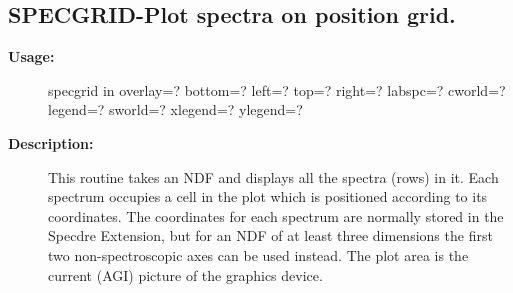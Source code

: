 \subsection{SPECGRID-\label{SPECGRID}Plot spectra on position grid.}
\begin{description}

\item [\textbf{Usage:}]

   specgrid in overlay=? bottom=? left=? top=? right=?
      labspc=? cworld=? legend=? sworld=? xlegend=? ylegend=?


\item [\textbf{Description:}]
   This routine takes an NDF and displays all the spectra (rows) in
   it. Each spectrum occupies a cell in the plot which is positioned
   according to its coordinates. The coordinates for each spectrum
   are normally stored in the Specdre Extension, but for an NDF of at
   least three dimensions the first two non-spectroscopic axes can be
   used instead. The plot area is the current (AGI) picture of the
   graphics device.



\end{description}
